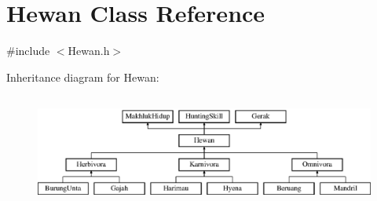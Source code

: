 \hypertarget{class_hewan}{}\section{Hewan Class Reference}
\label{class_hewan}


{\ttfamily \#include $<$Hewan.\+h$>$}

Inheritance diagram for Hewan\+:\begin{figure}[H]
\begin{center}
\leavevmode
\includegraphics[height=3.733333cm]{class_hewan}
\end{center}
\end{figure}
